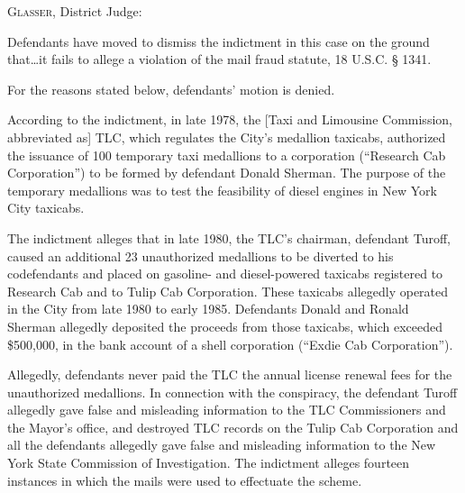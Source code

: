 

\opinion \textsc{Glasser}, District Judge:

Defendants have moved to dismiss the indictment in this case on the ground
that\ldots it fails to allege a violation of the mail fraud statute, 18 U.S.C.
{\S} 1341.

For the reasons stated below, defendants' motion is denied.


According to the indictment, in late 1978, the [Taxi and Limousine Commission,
abbreviated as] TLC, which regulates the City's
medallion taxicabs, authorized the issuance of 100 temporary taxi medallions to
a corporation (``Research Cab Corporation'') to be formed by defendant Donald
Sherman. The purpose of the temporary medallions was to test the feasibility of
diesel engines in New York City taxicabs.

The indictment alleges that in late 1980, the TLC's chairman, defendant Turoff,
caused an additional 23 unauthorized medallions to be diverted to his
codefendants and placed on gasoline- and diesel-powered taxicabs registered to
Research Cab and to Tulip Cab Corporation. These taxicabs allegedly operated in
the City from late 1980 to early 1985. Defendants Donald and Ronald Sherman
allegedly deposited the proceeds from those taxicabs, which exceeded \$500,000,
in the bank account of a shell corporation (``Exdie Cab Corporation'').

Allegedly, defendants never paid the TLC the annual license renewal fees for the
unauthorized medallions. In connection with the conspiracy, the defendant
Turoff allegedly gave false and misleading information to the TLC Commissioners
and the Mayor's office, and destroyed TLC records on the Tulip Cab Corporation
and all the defendants allegedly gave false and misleading information to the
New York State Commission of Investigation. The indictment alleges fourteen
instances in which the mails were used to effectuate the scheme.


